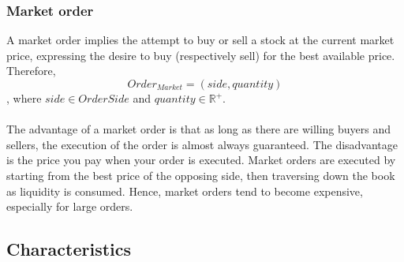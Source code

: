 \subsubsection{Market order}
\label{sec:market-order}

A market order implies the attempt to buy or sell a stock at the current market price, expressing the desire to buy (respectively sell) for the best available price. Therefore,
\begin{equation}
Order_{Market}=(side, quantity)
\end{equation}
, where $side \in OrderSide$ and $quantity \in \mathbb{R^+}$.
\\
\\
The advantage of a market order is that as long as there are willing buyers and sellers, the execution of the order is almost always guaranteed. \cite{sec-market-order}
The disadvantage is the price you pay when your order is executed.
Market orders are executed by starting from the best price of the opposing side, then traversing down the book as liquidity is consumed. 
Hence, market orders tend to become expensive, especially for large orders.

\subsection{Characteristics}
\label{sec:ob-characteristics}

